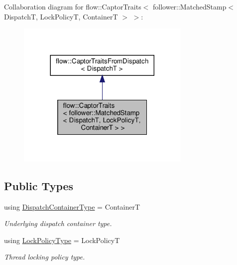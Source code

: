 Collaboration diagram for flow\+:\+:Captor\+Traits$<$ follower\+:\+:Matched\+Stamp$<$ DispatchT, Lock\+PolicyT, ContainerT $>$ $>$\+:
\nopagebreak
\begin{figure}[H]
\begin{center}
\leavevmode
\includegraphics[width=236pt]{structflow_1_1_captor_traits_3_01follower_1_1_matched_stamp_3_01_dispatch_t_00_01_lock_policy_t_7ec198212c635075794e1489a0c078fb}
\end{center}
\end{figure}
\subsection*{Public Types}
\begin{DoxyCompactItemize}
\item 
\mbox{\label{structflow_1_1_captor_traits_3_01follower_1_1_matched_stamp_3_01_dispatch_t_00_01_lock_policy_t_00_01_container_t_01_4_01_4_ac6eb9d1e99b863b35b8023d41cb44398}} 
using \hyperlink{structflow_1_1_captor_traits_3_01follower_1_1_matched_stamp_3_01_dispatch_t_00_01_lock_policy_t_00_01_container_t_01_4_01_4_ac6eb9d1e99b863b35b8023d41cb44398}{Dispatch\+Container\+Type} = ContainerT
\begin{DoxyCompactList}\small\item\em Underlying dispatch container type. \end{DoxyCompactList}\item 
\mbox{\label{structflow_1_1_captor_traits_3_01follower_1_1_matched_stamp_3_01_dispatch_t_00_01_lock_policy_t_00_01_container_t_01_4_01_4_aa4bdebe66d4013e880809d3bf374e622}} 
using \hyperlink{structflow_1_1_captor_traits_3_01follower_1_1_matched_stamp_3_01_dispatch_t_00_01_lock_policy_t_00_01_container_t_01_4_01_4_aa4bdebe66d4013e880809d3bf374e622}{Lock\+Policy\+Type} = Lock\+PolicyT
\begin{DoxyCompactList}\small\item\em Thread locking policy type. \end{DoxyCompactList}\end{DoxyCompactItemize}


